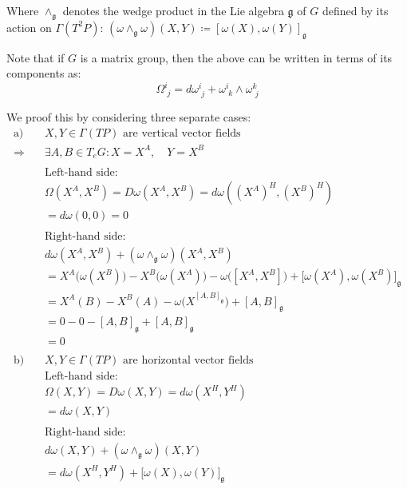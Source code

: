Where $\wedge_{\mathfrak{g}}$ denotes the wedge product in the Lie algebra $\mathfrak{g}$ of $G$ defined by its action on $\Gamma(T^2P)$: $(\omega \wedge_\mathfrak{g}\omega)(X,Y) \coloneq [ \omega(X), \omega(Y) ]_\mathfrak{g}$

Note that if $G$ is a matrix group, then the above can be written in terms of its components as:
\[ \Omega^i_{\,\,j} = d\omega^i_{\,\,j} + \omega^i_{\,\,k} \wedge \omega^k_{\,\,j} \] 

We proof this by considering three separate cases\cite{FredericSchullerCurvaturetorsionprincipalbundlesLec24FredericSchuller2015}:
\begin{align*}
  \text{a)} \quad & X, Y \in \Gamma(TP) \text{ are vertical vector fields} \\
  \Rightarrow\quad & \exists A, B \in T_eG : X = X^A, \quad Y = X^B \\
  \\
  & \text{Left-hand side:} \\
  & \Omega(X^A, X^B) = D\omega(X^A, X^B) = d\omega\left( (X^A)^H, (X^B)^H \right) \\
  &= d\omega(0, 0) = 0 \\
  \\
  & \text{Right-hand side:} \\
  & d\omega(X^A, X^B) + (\omega \wedge_{\mathfrak{g}} \omega)(X^A, X^B) \\
  &= X^A \big( \omega(X^B) \big) - X^B \big( \omega(X^A) \big) - \omega\big( [X^A, X^B] \big) + \big[ \omega(X^A), \omega(X^B) \big]_{\mathfrak{g}} \\
  &= X^A (B) - X^B (A) - \omega\big( X^{[A,B]_\mathfrak{g}} \big) + [A,B]_{\mathfrak{g}} \\
  &= 0 - 0 - [A,B]_{\mathfrak{g}} + [A,B]_{\mathfrak{g}} \\
  &= 0 \\
  \\ 
  \text{b)} \quad & X, Y \in \Gamma(TP) \text{ are horizontal vector fields} \\
    & \text{Left-hand side:} \\
  & \Omega(X,Y) = D\omega(X,Y) = d\omega(X^H, Y^H) \\
  &= d\omega(X, Y) \\
  \\
  &\text{Right-hand side:} \\
  & d\omega(X,Y) + (\omega \wedge_{\mathfrak{g}} \omega)(X,Y) \\
  &= d\omega(X^H, Y^H) + \big[ \omega(X), \omega(Y) \big]_\mathfrak{g} \\

\end{align*}
